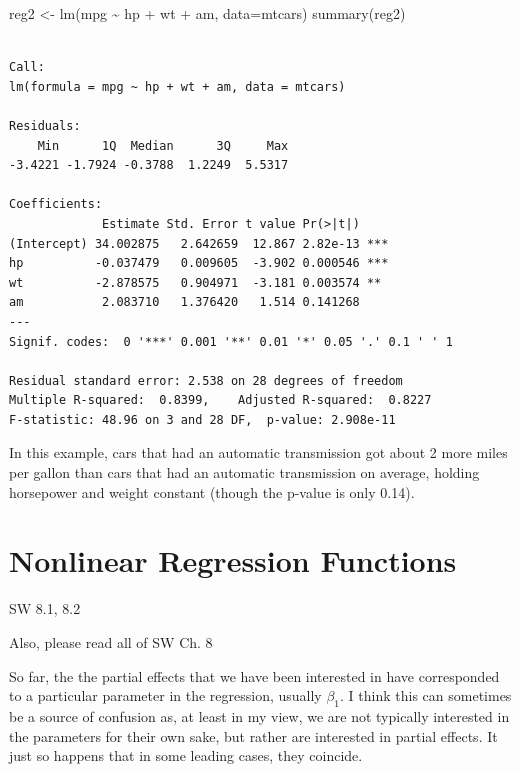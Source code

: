 \documentclass[
  letterpaper,
  DIV=11,
  numbers=noendperiod]{scrreprt}
\newenvironment{Shaded}{\begin{snugshade}}{\end{snugshade}}
\newcommand{\AttributeTok}[1]{\textcolor[rgb]{0.40,0.45,0.13}{#1}}
\newcommand{\FunctionTok}[1]{\textcolor[rgb]{0.28,0.35,0.67}{#1}}
\newcommand{\NormalTok}[1]{\textcolor[rgb]{0.00,0.23,0.31}{#1}}
\newcommand{\OtherTok}[1]{\textcolor[rgb]{0.00,0.23,0.31}{#1}}
\newcommand{\SpecialCharTok}[1]{\textcolor[rgb]{0.37,0.37,0.37}{#1}}
\begin{document}
\begin{Shaded}
\begin{Highlighting}[]
\NormalTok{reg2 }\OtherTok{\textless{}{-}} \FunctionTok{lm}\NormalTok{(mpg }\SpecialCharTok{\textasciitilde{}}\NormalTok{ hp }\SpecialCharTok{+}\NormalTok{ wt }\SpecialCharTok{+}\NormalTok{ am, }\AttributeTok{data=}\NormalTok{mtcars)}
\FunctionTok{summary}\NormalTok{(reg2)}
\end{Highlighting}
\end{Shaded}

\begin{verbatim}

Call:
lm(formula = mpg ~ hp + wt + am, data = mtcars)

Residuals:
    Min      1Q  Median      3Q     Max 
-3.4221 -1.7924 -0.3788  1.2249  5.5317 

Coefficients:
             Estimate Std. Error t value Pr(>|t|)    
(Intercept) 34.002875   2.642659  12.867 2.82e-13 ***
hp          -0.037479   0.009605  -3.902 0.000546 ***
wt          -2.878575   0.904971  -3.181 0.003574 ** 
am           2.083710   1.376420   1.514 0.141268    
---
Signif. codes:  0 '***' 0.001 '**' 0.01 '*' 0.05 '.' 0.1 ' ' 1

Residual standard error: 2.538 on 28 degrees of freedom
Multiple R-squared:  0.8399,    Adjusted R-squared:  0.8227 
F-statistic: 48.96 on 3 and 28 DF,  p-value: 2.908e-11
\end{verbatim}

In this example, cars that had an automatic transmission got about 2
more miles per gallon than cars that had an automatic transmission on
average, holding horsepower and weight constant (though the p-value is
only 0.14).

\section{Nonlinear Regression
Functions}\label{nonlinear-regression-functions}

SW 8.1, 8.2

Also, please read all of SW Ch. 8

So far, the the partial effects that we have been interested in have
corresponded to a particular parameter in the regression, usually
\(\beta_1\). I think this can sometimes be a source of confusion as, at
least in my view, we are not typically interested in the parameters for
their own sake, but rather are interested in partial effects. It just so
happens that in some leading cases, they coincide.
\end{document}
